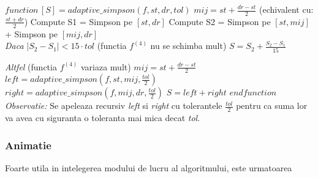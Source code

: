 \documentclass{article}
\begin{document}
\tabto{0.5cm} $function\, [S] = adaptive\_simpson(f, st, dr, tol)$
    \tabto{1cm} $mij = st + \frac{dr-st}{2}$ (echivalent cu: $\frac{st+dr}{2}$) \framebox[0.4cm][r]{\footnotemark}
    \tabto{1cm} Compute S1 = Simpson pe $[st,dr]$
    \tabto{1cm} Compute S2 = Simpson pe $[st,mij]$ + Simpson pe $[mij,dr]$ \\

    \tabto{1cm} \textit{Daca} $|S_2 - S_1| < 15 \cdot tol$ (functia $f^{(4)}$ nu se schimba mult)
        \tabto{1.5cm} $S = S_2 + \frac{S_2 - S_1}{15}$\vspace{0.1cm}
        
    \tabto{1cm} \textit{Altfel} (functia $f^{(4)}$ variaza mult)
        \tabto{1.5cm} $mij = st + \frac{dr-st}{2}$
        \tabto{1.5cm} $left = adaptive\_simpson(f, st, mij, \frac{tol}{2})$
        \tabto{1.5cm} $right = adaptive\_simpson(f, mij, dr, \frac{tol}{2})$
        \tabto{1.5cm} $S = left + right$ 
\tabto{0.5cm} $endfunction$ \\


\tabto{0.5cm} \textit{Observatie:} Se apeleaza recursiv \textit{left} si \textit{right} cu tolerantele $\frac{tol}{2}$ pentru ca suma lor va avea cu siguranta o toleranta mai mica decat \textit{tol}.


\subsubsection{Animatie}

\tab Foarte utila in intelegerea modului de lucru al algoritmului, 
este urmatoarea  \newpage
\end{document}
